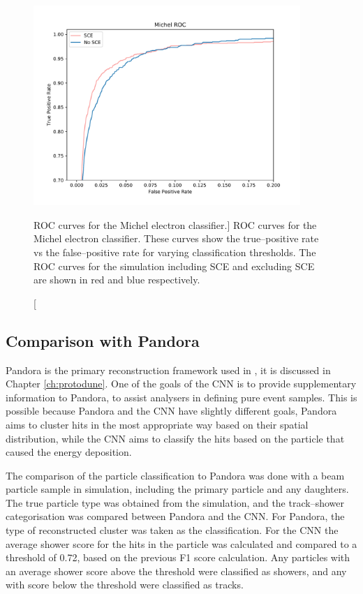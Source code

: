 \begin{figure}
	\centering
	\includegraphics[width=0.9\textwidth]{figures/michel_roc_comparison.pdf}
	\caption
	[ROC curves for the Michel electron classifier.]
	{ROC curves for the Michel electron classifier. These curves show
	the true--positive rate vs the false--positive rate for varying classification
	thresholds. The ROC curves for the \protodune{} simulation including SCE and
	excluding SCE are shown in red and blue respectively.}
	\label{fig:michel_roc}
\end{figure}

\subsection{Comparison with Pandora}
Pandora is the primary reconstruction framework used in \protodune{}, it is
discussed in Chapter \ref{ch:protodune}. One of the goals of the CNN is to
provide supplementary information to Pandora, to assist analysers in defining 
pure event samples. This is possible because Pandora and the CNN have slightly
different goals, Pandora aims to cluster hits in the most appropriate way based
on their spatial distribution, while the CNN aims to classify the hits based on 
the particle that caused the energy deposition.

The comparison of the particle classification to Pandora was done with a beam 
particle sample in \protodune{} simulation, including the primary particle and 
any daughters. The true particle type was obtained from the simulation, and 
the track--shower categorisation was compared between Pandora and the CNN. For 
Pandora, the type of reconstructed cluster was taken as the classification. 
For the CNN the average shower score for the hits in the particle was 
calculated and compared to a threshold of 0.72, based on the previous F1 score 
calculation. Any particles with an average shower score above the threshold were
classified as showers, and any with score below the threshold were classified 
as tracks. 

